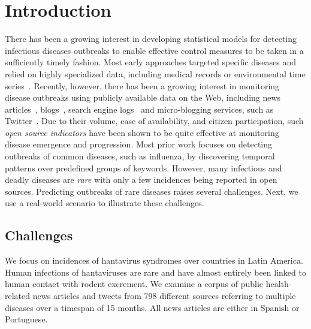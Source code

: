 \documentclass[conference]{IEEEtran}
\begin{document}
\section{Introduction}
\label{sec:intro}
There has been a growing interest in developing statistical models for detecting infectious diseases outbreaks to enable effective control measures to be taken in a sufficiently timely fashion. Most early approaches targeted specific diseases and relied on highly specialized data, including medical records or environmental time series~\cite{wong:02,wong:03}.  Recently, however, there has been a growing interest in monitoring disease outbreaks using publicly available data on the Web, including news articles~\cite{brownstein:2008,linge:09}, blogs~\cite{corley:10}, search engine logs~\cite{ginsberg:09} and micro-blogging services, such as Twitter~\cite{culotta:2010, paul:11, parker:13}. Due to their volume, ease of availability, and citizen participation, such {\em open source indicators} have been shown to be quite effective at monitoring disease emergence and progression. Most prior work focuses on detecting outbreaks of common diseases, such as influenza, by discovering temporal patterns over predefined groups of keywords. However, many infectious and deadly diseases are {\em rare} with only a few incidences being reported in open sources. Predicting outbreaks of rare diseases raises several challenges. Next, we use a real-world scenario to illustrate these challenges.




\subsection{Challenges}
\label{sec:challenges}
We focus on incidences of hantavirus syndromes over countries in Latin America. Human infections of hantaviruses are rare and have almost entirely been linked to human contact with rodent excrement. We examine a corpus of public health-related news articles and tweets from 798 different sources referring to multiple diseases over a timespan of 15 months. All news articles are either in Spanish or Portuguese.
\end{document}
